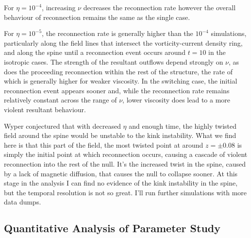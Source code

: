 For $\eta=10^{-4}$, increasing $\nu$ decreases the reconnection rate however the overall behaviour of reconnection remains the same as the single case.

For $\eta=10^{-5}$, the reconnection rate is generally higher than the $10^{-4}$ simulations, particularly along the field lines that intersect the vorticity-current density ring, and along the spine until a reconnection event occurs around $t=10$ in the isotropic cases. The strength of the resultant outflows depend strongly on $\nu$, as does the proceeding reconnection within the rest of the structure, the rate of which is generally higher for weaker viscosity. In the switching case, the initial reconnection event appears sooner and, while the reconnection rate remains relatively constant across the range of $\nu$, lower viscosity does lead to a more violent resultant behaviour.

Wyper conjectured that with decreased $\eta$ and enough time, the highly twisted field around the spine would be unstable to the kink instability. What we find here is that this part of the field, the most twisted point at around $z=\pm 0.08$ is simply the initial point at which reconnection occurs, causing a cascade of violent reconnection into the rest of the null. It's the increased twist in the spine, caused by a lack of magnetic diffusion, that causes the null to collapse sooner. At this stage in the analysis I can find no evidence of the kink instability in the spine, but the temporal resolution is not so great. I'll run further simulations with more data dumps.

\subsection{Quantitative Analysis of Parameter Study}


